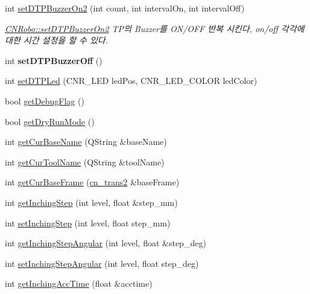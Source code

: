 \begin{DoxyCompactItemize}
\item 
int \hyperlink{classCNRobo_a0257abf082a78f259a46ddf986fcb43d}{set\-D\-T\-P\-Buzzer\-On2} (int count, int interval\-On, int interval\-Off)
\begin{DoxyCompactList}\small\item\em \hyperlink{classCNRobo_a0257abf082a78f259a46ddf986fcb43d}{C\-N\-Robo\-::set\-D\-T\-P\-Buzzer\-On2} T\-P의 Buzzer를 O\-N/\-O\-F\-F 반복 시킨다, on/off 각각에 대한 시간 설정을 할 수 있다. \end{DoxyCompactList}\item 
\hypertarget{classCNRobo_ace87b3513fb166da6614ce824f804834}{int {\bfseries set\-D\-T\-P\-Buzzer\-Off} ()}\label{classCNRobo_ace87b3513fb166da6614ce824f804834}

\item 
int \hyperlink{classCNRobo_ae5be33097b3570fa08100d9656ee1cfa}{set\-D\-T\-P\-Led} (C\-N\-R\-\_\-\-L\-E\-D led\-Pos, C\-N\-R\-\_\-\-L\-E\-D\-\_\-\-C\-O\-L\-O\-R led\-Color)
\item 
bool \hyperlink{classCNRobo_a4966f75d53b4c35d207ba52b6e5b07fa}{get\-Debug\-Flag} ()
\item 
bool \hyperlink{classCNRobo_a9f05f8910c1e7adea5d5811a00471206}{get\-Dry\-Run\-Mode} ()
\item 
int \hyperlink{classCNRobo_a3e1355ffe694a9d07c36fcf426eb62c9}{get\-Cur\-Base\-Name} (Q\-String \&base\-Name)
\item 
int \hyperlink{classCNRobo_abbfbc8b564d54a49dc902f37f7748355}{get\-Cur\-Tool\-Name} (Q\-String \&tool\-Name)
\item 
int \hyperlink{classCNRobo_a459479fbafe108d7a42c65f62e202f48}{get\-Cur\-Base\-Frame} (\hyperlink{structcn__trans2}{cn\-\_\-trans2} \&base\-Frame)
\item 
int \hyperlink{classCNRobo_a00b52587337bc81ac07faf35ba305519}{get\-Inching\-Step} (int level, float \&step\-\_\-mm)
\item 
int \hyperlink{classCNRobo_a00f405622f7b88bfa9058a5c6bd0e6c9}{set\-Inching\-Step} (int level, float step\-\_\-mm)
\item 
int \hyperlink{classCNRobo_af554a1b953cb86c924010b89feed52ae}{get\-Inching\-Step\-Angular} (int level, float \&step\-\_\-deg)
\item 
int \hyperlink{classCNRobo_a8e03f0891e679b8608ec438678aac2cf}{set\-Inching\-Step\-Angular} (int level, float step\-\_\-deg)
\item 
int \hyperlink{classCNRobo_a486dae85bc0804196dbe6633ecd5d4eb}{get\-Inching\-Acc\-Time} (float \&acctime)

\end{DoxyCompactItemize}
